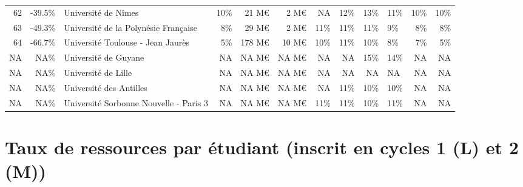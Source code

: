 \documentclass[12pt,french,landscape]{article}
\begin{document}
\begin{longtable}{rrlrrrrrrlrr}
62 & -39.5\% & Université de Nîmes & 10\% & 21 M€ & 2 M€ & NA & 12\% & 13\% & 11\% & 10\% & 10\%\\
\rowcolor{gray!6}  63 & -49.3\% & Université de la Polynésie Française & 8\% & 29 M€ & 2 M€ & 11\% & 11\% & 11\% & 9\% & 8\% & 8\%\\
64 & -66.7\% & Université Toulouse - Jean Jaurès & 5\% & 178 M€ & 10 M€ & 10\% & 11\% & 10\% & 8\% & 7\% & 5\%\\
\rowcolor{gray!6}  NA & NA\% & Université de Guyane & NA & NA M€ & NA M€ & NA & NA & 15\% & 14\% & NA & NA\\
\addlinespace
NA & NA\% & Université de Lille & NA & NA M€ & NA M€ & NA & NA & NA & NA & NA & NA\\
\rowcolor{gray!6}  NA & NA\% & Université des Antilles & NA & NA M€ & NA M€ & NA & 11\% & 10\% & 10\% & NA & NA\\
NA & NA\% & Université Sorbonne Nouvelle - Paris 3 & NA & NA M€ & NA M€ & 11\% & 11\% & 10\% & 11\% & NA & NA\\*
\end{longtable}

\newpage

\hypertarget{taux-de-ressources-par-uxe9tudiant-inscrit-en-cycles-1-l-et-2-m}{%
\section{Taux de ressources par étudiant (inscrit en cycles 1 (L) et 2
(M))}\label{taux-de-ressources-par-uxe9tudiant-inscrit-en-cycles-1-l-et-2-m}}
\end{document}
